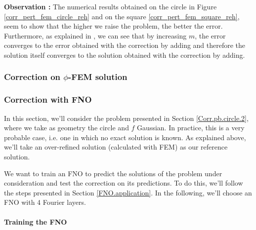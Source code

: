 	\textbf{Observation :} The numerical results obtained on the circle in Figure \ref{corr_pert_fem_circle_reh} and on the square \ref{corr_pert_fem_square_reh}, seem to show that the higher we raise the problem, the better the error. Furthermore, as explained in , we can see that by increasing $m$, the error converges to the error obtained with the correction by adding and therefore the solution itself converges to the solution obtained with the correction by adding. 


\subsubsection{Correction on $\phi$-FEM solution} \label{Corr.results.phifem}


\subsubsection{Correction with FNO} \label{Corr.results.FNO}


In this section, we'll consider the problem presented in Section \ref{Corr.pb.circle.2}, where we take as geometry the circle and $f$ Gaussian. In practice, this is a very probable case, i.e. one in which no exact solution is known. As explained above, we'll take an over-refined solution (calculated with FEM) as our reference solution. 

We want to train an FNO to predict the solutions of the problem under consideration and test the correction on its predictions. To do this, we'll follow the steps presented in Section \ref{FNO.application}. In the following, we'll choose an FNO with 4 Fourier layers.

\paragraph{Training the FNO} \label{Corr.results.FNO.Training}


